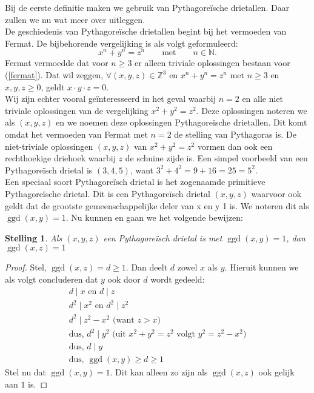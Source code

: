 \documentclass[12pt,reqno]{article}
\newcommand*{\NN}{\ensuremath{\mathbb{N}}}
\newcommand*{\ZZ}{\ensuremath{\mathbb{Z}}}
\theoremstyle{theorem}
\newtheorem{theorem}{Stelling}
\theoremstyle{definition}
\DeclareMathOperator{\ggd}{ggd}
\begin{document}
	
	
	Bij de eerste definitie maken we gebruik van Pythagore\"ische drietallen. Daar zullen we nu wat meer over uitleggen.\\
	
	De geschiedenis van Pythagore\"ische drietallen begint bij het vermoeden van Fermat. De bijbehorende vergelijking is als volgt geformuleerd:
	\begin{equation}\label{fermat}
		x^n + y^n = z^n \qquad \text{met} \qquad n \in \NN.
	\end{equation}
	Fermat vermoedde dat voor $n \geq 3$ er alleen triviale oplossingen bestaan voor (\ref{fermat}). Dat wil zeggen, $\forall (x,y,z) \in \ZZ^3$ en $x^n + y^n = z^n$ met $n \geq 3$ en $x, y, z \geq 0$, geldt $x \cdot y \cdot z = 0$. \\
	Wij zijn echter vooral ge\"interesseerd in het geval waarbij $n=2$ en alle niet triviale oplossingen van de vergelijking $x^2 + y^2 = z^2$. Deze oplossingen noteren we als $(x,y,z)$ en we noemen deze oplossingen Pythagore\"ische drietallen. Dit komt omdat het vermoeden van Fermat met $n=2$ de stelling van Pythagoras is. De niet-triviale oplossingen $(x,y,z)$ van $x^2 + y^2 = z^2$ vormen dan ook een rechthoekige driehoek waarbij $z$ de schuine zijde is. Een simpel voorbeeld van een Pythagore\"isch drietal is $(3,4,5)$, want $3^2 + 4^2 = 9 + 16 = 25 = 5^2$. \\
	Een speciaal soort Pythagore\"isch drietal is het zogenaamde primitieve \mbox{Pythagore\"ische} drietal. Dit is een Pythagore\"isch drietal $(x,y,z)$ waarvoor ook geldt dat de grootste gemeenschappelijke deler van x en y 1 is. We noteren dit als $\ggd(x,y) = 1$. Nu kunnen en gaan we het volgende bewijzen:
	\begin{theorem}
		Als $(x,y,z)$ een Pythagore\"isch drietal is met $\ggd(x,y) = 1$, dan $\ggd(x,z) = 1$
	\end{theorem}
	\begin{proof}
	Stel, $\ggd(x,z) = d \geq 1$. Dan deelt $d$ zowel $x$ als $y$. Hieruit kunnen we als volgt concluderen dat $y$ ook door $d$ wordt gedeeld:
	\begin{align*}
	d\mid x \text{ en } d\mid z \\
	d^2\mid x^2 \text{ en } d^2 \mid z^2 \\
	d^2\mid z^2 - x^2 \text{ (want } z>x \text{)} \\
	\text{dus, } d^2 \mid y^2 \text{ (uit $x^2 + y^2 = z^2$ volgt $y^2 = z^2 - x^2$)} \\
	\text{dus, } d \mid y \\
	\text{dus, } \ggd(x, y) \geq d \geq 1
	\end{align*}
	Stel nu dat $\ggd(x, y) = 1$. Dit kan alleen zo zijn als $\ggd(x, z) $ ook gelijk aan $1$ is. 
	\end{proof}	
\end{document}
